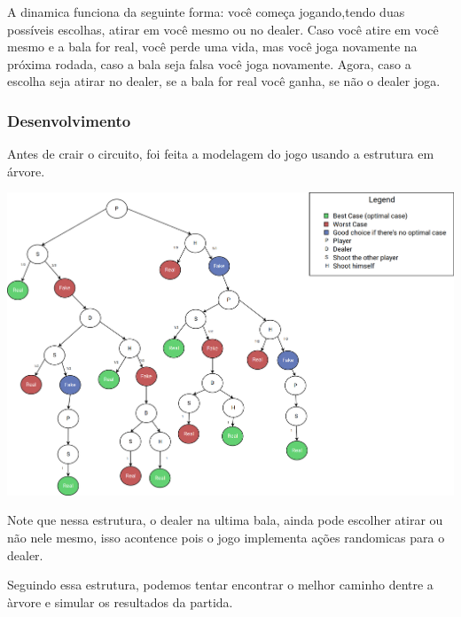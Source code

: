 \documentclass{article}
\begin{document}
A dinamica funciona da seguinte forma: você começa jogando,tendo duas possíveis escolhas, atirar em você mesmo ou no dealer. Caso você atire em você mesmo e a bala for real, você perde uma vida, mas você joga novamente na próxima rodada, caso a bala seja falsa você joga novamente. Agora, caso a escolha seja atirar no dealer, se a bala for real você ganha, se não o dealer joga.


\subsubsection{Desenvolvimento}

Antes de crair o circuito, foi feita a modelagem do jogo usando a estrutura em árvore.

\begin{center}
	\includegraphics[scale=0.2]{buckshot-roulette-diagram.png}
	\label{fig:classical-model-bckr}
\end{center}

Note que nessa estrutura, o dealer na ultima bala, ainda pode escolher atirar ou não nele mesmo, isso acontence pois o jogo implementa ações randomicas para o dealer.

Seguindo essa estrutura, podemos tentar encontrar o melhor caminho dentre a àrvore e simular os resultados da partida.
\end{document}
